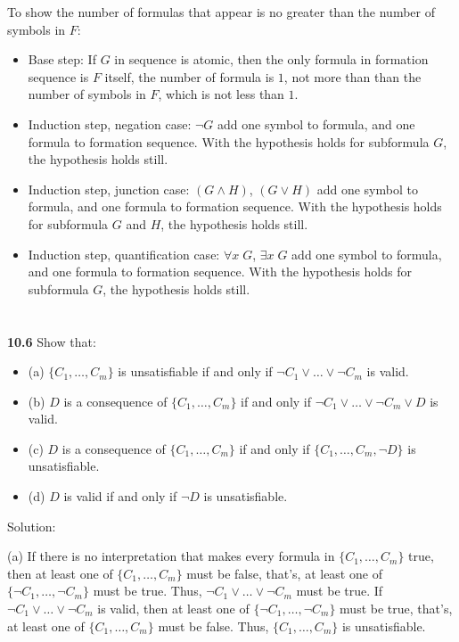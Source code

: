 \documentclass{ctexart}
\begin{document}
To show the number of formulas that appear is no greater than the number of symbols in $F$:
\begin{itemize}
	\item Base step: If $G$ in sequence is atomic, then the only formula in formation sequence is $F$ itself,
	the number of formula is $1$, not more than than the number of symbols in $F$, which is not less
	than $1$.
	
	\item Induction step, negation case: $\lnot G$ add one symbol to formula, and one formula to formation
	sequence. With the hypothesis holds for subformula $G$, the hypothesis holds still.
	
	\item Induction step, junction case: $(G \land H)$, $(G \lor H)$ add one symbol to formula, and one formula to formation
	sequence. With the hypothesis holds for subformula $G$ and $H$, the hypothesis holds still.
	
	\item Induction step, quantification case: $\forall x\; G$, $\exists x\; G$ add one symbol to formula, and one formula to formation
	sequence. With the hypothesis holds for subformula $G$, the hypothesis holds still.
\end{itemize}

\section*{}
\textbf{10.6} Show that:
\begin{itemize}
\item (a) $\{C_1 , \dots , C_m \}$ is unsatisfiable if and only if $\lnot C_1 \lor \dots \lor \lnot C_m$ is valid.
\item (b) $D$ is a consequence of $\{C_1 , \dots , C_m \}$ if and only if $\lnot C_1 \lor \dots \lor \lnot C_m \lor D$
is valid.
\item (c) $D$ is a consequence of $\{C_1 , \dots , C_m \}$ if and only if $\{C_1 , \dots , C_m, \lnot D\}$ is
unsatisfiable.
\item (d) $D$ is valid if and only if $\lnot D$ is unsatisfiable.
\end{itemize}

Solution:

(a) If there is no interpretation that makes every formula in $\{C_1 , \dots , C_m \}$ true, then at least one
of $\{C_1 , \dots , C_m \}$ must be false, that's, at least one of $\{ \lnot C_1, \dots, \lnot C_m \}$ must
be true. Thus, $\lnot C_1 \lor \dots \lor \lnot C_m$ must be true.
If $\lnot C_1 \lor \dots \lor \lnot C_m$ is valid, then at least one of $\{ \lnot C_1, \dots, \lnot C_m \}$ must
be true, that's, at least one of $\{C_1 , \dots , C_m \}$ must be false. Thus, $\{C_1 , \dots , C_m \}$ is unsatisfiable.
\end{document}
